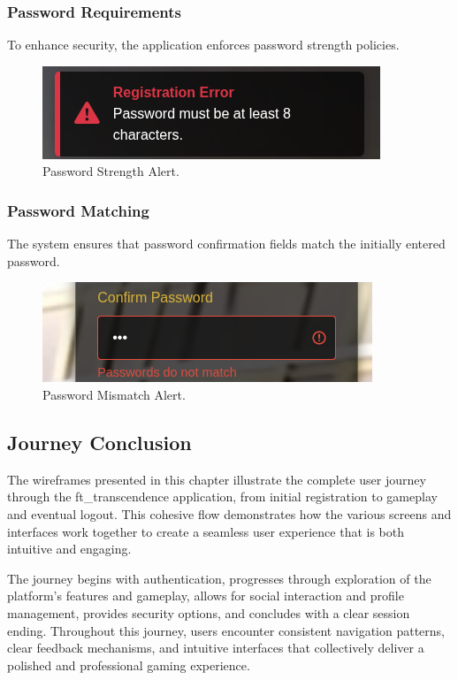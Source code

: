 \subsubsection{Password Requirements} To enhance security, the application enforces password strength policies.

\begin{figure}[H]
    \centering
    \includegraphics[width=0.65\linewidth]{Figures/images/new_images/ErrorPassword.png}
    \caption{Password Strength Alert.} %
    \label{fig:error-password-journey}
\end{figure}

\subsubsection{Password Matching} The system ensures that password confirmation fields match the initially entered password.

\begin{figure}[H]
    \centering
    \includegraphics[width=0.65\linewidth]{Figures/images/new_images/ErrorConfirmPassword.png}
    \caption{Password Mismatch Alert.} %
    \label{fig:error-confirm-password-journey}
\end{figure}

\subsection{Journey Conclusion}

The wireframes presented in this chapter illustrate the complete user journey through the ft\_transcendence application, from initial registration to gameplay and eventual logout. This cohesive flow demonstrates how the various screens and interfaces work together to create a seamless user experience that is both intuitive and engaging.

The journey begins with authentication, progresses through exploration of the platform's features and gameplay, allows for social interaction and profile management, provides security options, and concludes with a clear session ending. Throughout this journey, users encounter consistent navigation patterns, clear feedback mechanisms, and intuitive interfaces that collectively deliver a polished and professional gaming experience.
